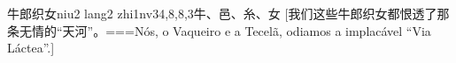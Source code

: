\begin{EntryWithPhonetic}{牛郎织女}{niu2 lang2 zhi1nv3}{4,8,8,3}{⽜、⾢、⽷、⼥}
  [我们这些牛郎织女都恨透了那条无情的“天河”。===Nós, o Vaqueiro e a Tecelã, odiamos a implacável ``Via Láctea''.]
\end{EntryWithPhonetic}

